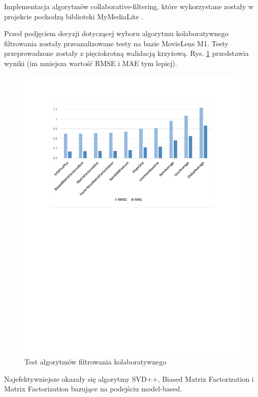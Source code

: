\documentclass[twoside]{iisthesis}
\begin{document}
		 Implementacja algorytmów collaborative-filtering, które wykorzystane zostały w projekcie pochodzą biblioteki MyMediaLite \cite{mymedialite}\cite{gantner2011mymedialite}. 
	 
		 Przed podjęciem decyzji dotyczącej wyboru algorytmu kolaboratywnego filtrowania zostały przeanalizowane testy na bazie MovieLens M1\cite{harper2016movielens}. Testy przeprowadzone zostały z pięciokrotną walidacją krzyżową. Rys. \ref{fig:cfcomparision} przedstawia wyniki (im mniejsza wartość RMSE i MAE tym lepiej). 
	 
		 \begin{figure}[!ht] 
		 	\centering
		 	\includegraphics[width=1\textwidth]{cfcomparision}
		 	\caption{Test algorytmów filtrowania kolaboratywnego \protect\cite{mymedialitedatasets}}
		 	\label{fig:cfcomparision}
		 \end{figure}
	 
		 Najefektywniejsze okazały się algorytmy SVD++, Biased Matrix Factorization i Matrix Factorization bazujące na podejściu model-based. 
	 	 
\end{document}
